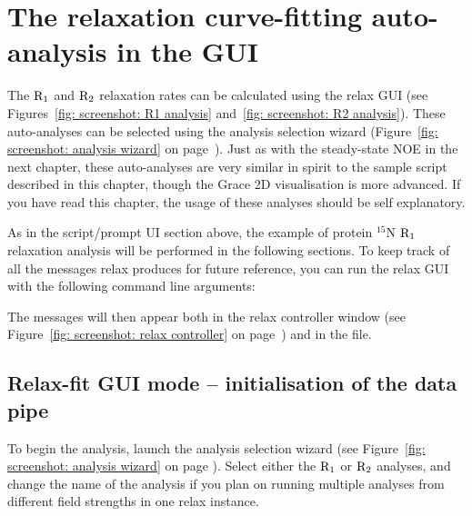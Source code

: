 
\newpage
\section{The relaxation curve-fitting auto-analysis in the GUI}

The $\mathrm{R}_1$ and $\mathrm{R}_2$ relaxation rates can be calculated using the relax GUI (see Figures~\ref{fig: screenshot: R1 analysis} and~\ref{fig: screenshot: R2 analysis}).
These auto-analyses can be selected using the analysis selection wizard (Figure~\ref{fig: screenshot: analysis wizard} on page~\pageref{fig: screenshot: analysis wizard}).
Just as with the steady-state NOE in the next chapter, these auto-analyses are very similar in spirit to the sample script described in this chapter, though the Grace 2D visualisation is more advanced.
If you have read this chapter, the usage of these analyses should be self explanatory.

As in the script/prompt UI section above, the example of protein $^{15}$N $\mathrm{R}_1$ relaxation analysis will be performed in the following sections.
To keep track of all the messages relax produces for future reference, you can run the relax GUI with the following command line arguments:


The messages will then appear both in the relax controller window (see Figure~\ref{fig: screenshot: relax controller} on page~\pageref{fig: screenshot: relax controller}) and in the  file.



\subsection{Relax-fit GUI mode -- initialisation of the data pipe}

To begin the analysis, launch the analysis selection wizard (see Figure~\ref{fig: screenshot: analysis wizard} on page \pageref{fig: screenshot: analysis wizard}).
Select either the $\mathrm{R}_1$ or $\mathrm{R}_2$ analyses, and change the name of the analysis if you plan on running multiple analyses from different field strengths in one relax instance.

